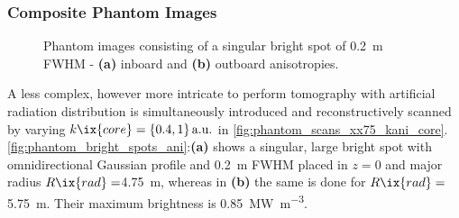             \subsubsection*{Composite Phantom Images}%
%
                \begin{figure}%
                    \centering%
                    \caption{Phantom images consisting of a singular bright spot of \SI{0.2}{\meter} FWHM -  \textbf{(a)} inboard and \textbf{(b)} outboard anisotropies.}\label{fig:phantom_bright_spots_ani}%
                \end{figure}%
%
                A less complex, however more intricate to perform tomography with artificial radiation distribution is simultaneously introduced and reconstructively scanned by varying $k\ix{core}=\left\{0.4, 1\right\}\text{a.u.}$ in \cref{fig:phantom_scans_xx75_kani_core}. \autoref{fig:phantom_bright_spots_ani}:\textbf{(a)} shows a singular, large bright spot with omnidirectional Gaussian profile and \SI{0.2}{\meter} FWHM placed in $z=0$ and major radius $R\ix{rad}=$\SI{4.75}{\meter}, whereas in \textbf{(b)} the same is done for $R\ix{rad}=$\SI{5.75}{\meter}. Their maximum brightness is \SI{0.85}{\mega\watt\per\cubic\meter}.\\%
%
